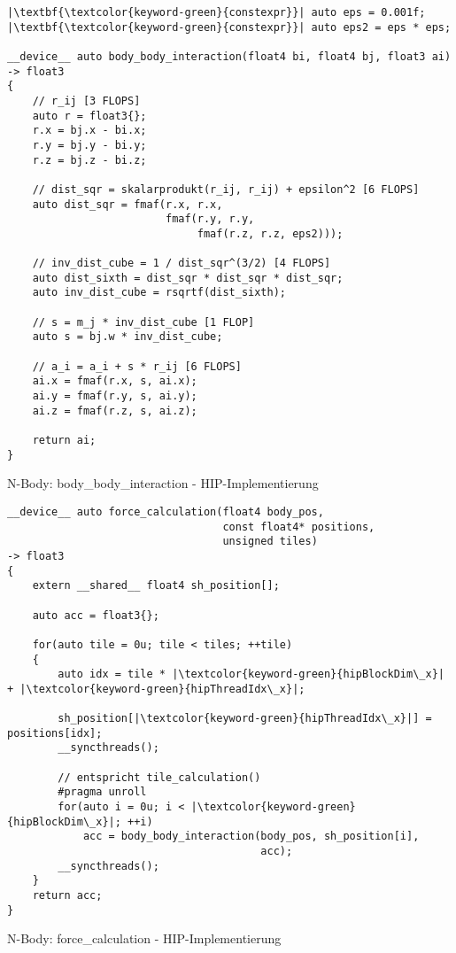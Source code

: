 \begin{code}
    \begin{verbatim}
|\textbf{\textcolor{keyword-green}{constexpr}}| auto eps = 0.001f;
|\textbf{\textcolor{keyword-green}{constexpr}}| auto eps2 = eps * eps;

__device__ auto body_body_interaction(float4 bi, float4 bj, float3 ai)
-> float3
{
    // r_ij [3 FLOPS]
    auto r = float3{};
    r.x = bj.x - bi.x;
    r.y = bj.y - bi.y;
    r.z = bj.z - bi.z;

    // dist_sqr = skalarprodukt(r_ij, r_ij) + epsilon^2 [6 FLOPS]
    auto dist_sqr = fmaf(r.x, r.x,
                         fmaf(r.y, r.y,
                              fmaf(r.z, r.z, eps2)));

    // inv_dist_cube = 1 / dist_sqr^(3/2) [4 FLOPS]
    auto dist_sixth = dist_sqr * dist_sqr * dist_sqr;
    auto inv_dist_cube = rsqrtf(dist_sixth);

    // s = m_j * inv_dist_cube [1 FLOP]
    auto s = bj.w * inv_dist_cube;

    // a_i = a_i + s * r_ij [6 FLOPS]
    ai.x = fmaf(r.x, s, ai.x);
    ai.y = fmaf(r.y, s, ai.y);
    ai.z = fmaf(r.z, s, ai.z);

    return ai;
}
    \end{verbatim}
    \caption{N-Body: body\_body\_interaction - HIP-Implementierung}
    \label{anhang:hip:bodybodyinteraction}
\end{code}

\begin{code}
    \begin{verbatim}
__device__ auto force_calculation(float4 body_pos,
                                  const float4* positions,
                                  unsigned tiles)
-> float3
{
    extern __shared__ float4 sh_position[];

    auto acc = float3{};

    for(auto tile = 0u; tile < tiles; ++tile)
    {
        auto idx = tile * |\textcolor{keyword-green}{hipBlockDim\_x}| + |\textcolor{keyword-green}{hipThreadIdx\_x}|;

        sh_position[|\textcolor{keyword-green}{hipThreadIdx\_x}|] = positions[idx];
        __syncthreads();

        // entspricht tile_calculation()
        #pragma unroll
        for(auto i = 0u; i < |\textcolor{keyword-green}{hipBlockDim\_x}|; ++i)
            acc = body_body_interaction(body_pos, sh_position[i],
                                        acc);
        __syncthreads();
    }
    return acc;
}
    \end{verbatim}
    \caption{N-Body: force\_calculation - HIP-Implementierung}
    \label{anhang:hip:forcecalculation}
\end{code}


